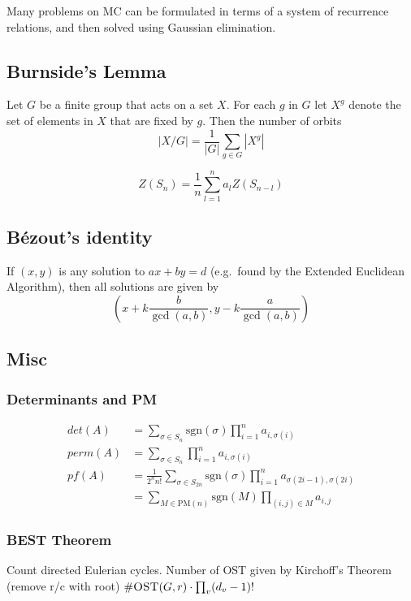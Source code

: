       Many problems on MC can be formulated in terms of a system of
      recurrence relations, and then solved using Gaussian elimination.

    \subsection{Burnside's Lemma}
      Let $G$ be a finite group that acts on a set $X$. For each $g$ in $G$
      let $X^g$ denote the set of elements in $X$ that are fixed by $g$. Then
      the number of orbits \[ |X/G| = \frac{1}{|G|} \sum_{g\in G} |X^g| \]

      \[
          Z(S_n) = \frac{1}{n} \sum_{l=1}^n a_l Z(S_{n-l})
      \]

    \subsection{Bézout's identity}
      If $(x,y)$ is any solution to $ax+by=d$ (e.g.\ found by the Extended
      Euclidean Algorithm), then all solutions are given by \[
      \left(x+k\frac{b}{\gcd(a,b)}, y-k\frac{a}{\gcd(a,b)}\right) \]

    \subsection{Misc}
      \subsubsection{Determinants and PM}
        \begin{align*}
          det(A) &= \sum_{\sigma \in S_n}\text{sgn}(\sigma)\prod_{i = 1}^n a_{i,\sigma(i)}\\
          perm(A) &= \sum_{\sigma \in S_n} \prod_{i = 1}^n a_{i,\sigma(i)}\\
          pf(A) &= \frac{1}{2^nn!}\sum_{\sigma \in S_{2n}} \text{sgn}(\sigma)\prod_{i = 1}^n a_{\sigma(2i-1),\sigma(2i)}\\ &= \sum_{M \in \text{PM}(n)} \text{sgn}(M) \prod_{(i,j) \in M} a_{i,j}
        \end{align*}

      \subsubsection{BEST Theorem}
        Count directed Eulerian cycles. Number of OST given by
        Kirchoff's Theorem (remove r/c with root) $\#\textsc{OST}(G,r)
        \cdot \prod_{v}(d_v-1)!$

